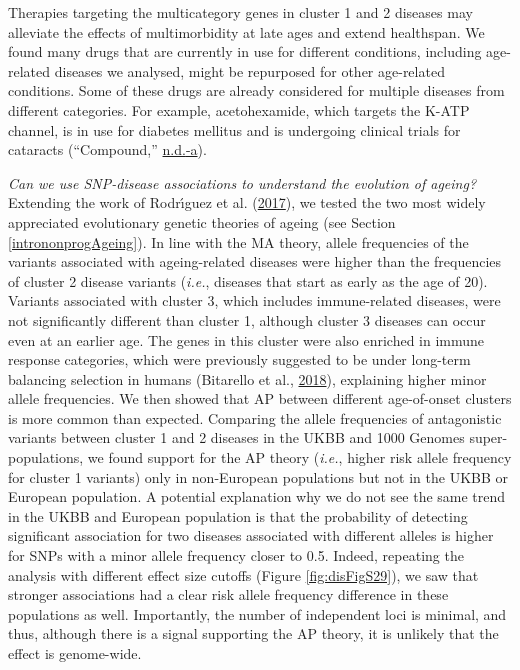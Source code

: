 \documentclass[12pt,twoside]{unicam}
\begin{document}
Therapies targeting the multicategory genes in cluster 1 and 2 diseases may alleviate the effects of multimorbidity at late ages and extend healthspan. We found many drugs that are currently in use for different conditions, including age-related diseases we analysed, might be repurposed for other age-related conditions. Some of these drugs are already considered for multiple diseases from different categories. For example, acetohexamide, which targets the K-ATP channel, is in use for diabetes mellitus and is undergoing clinical trials for cataracts (``Compound,'' \protect\hyperlink{ref-Acetohexamide2020}{n.d.}\protect\hyperlink{ref-Acetohexamide2020}{-a}).

\emph{Can we use SNP-disease associations to understand the evolution of ageing?} Extending the work of Rodrı́guez et al. (\protect\hyperlink{ref-Rodriguez2017}{2017}), we tested the two most widely appreciated evolutionary genetic theories of ageing (see Section \ref{intrononprogAgeing}). In line with the MA theory, allele frequencies of the variants associated with ageing-related diseases were higher than the frequencies of cluster 2 disease variants (\emph{i.e.}, diseases that start as early as the age of 20). Variants associated with cluster 3, which includes immune-related diseases, were not significantly different than cluster 1, although cluster 3 diseases can occur even at an earlier age. The genes in this cluster were also enriched in immune response categories, which were previously suggested to be under long-term balancing selection in humans (Bitarello et al., \protect\hyperlink{ref-Bitarello2018}{2018}), explaining higher minor allele frequencies. We then showed that AP between different age-of-onset clusters is more common than expected. Comparing the allele frequencies of antagonistic variants between cluster 1 and 2 diseases in the UKBB and 1000 Genomes super-populations, we found support for the AP theory (\emph{i.e.}, higher risk allele frequency for cluster 1 variants) only in non-European populations but not in the UKBB or European population. A potential explanation why we do not see the same trend in the UKBB and European population is that the probability of detecting significant association for two diseases associated with different alleles is higher for SNPs with a minor allele frequency closer to 0.5. Indeed, repeating the analysis with different effect size cutoffs (Figure \ref{fig:disFigS29}), we saw that stronger associations had a clear risk allele frequency difference in these populations as well. Importantly, the number of independent loci is minimal, and thus, although there is a signal supporting the AP theory, it is unlikely that the effect is genome-wide.
\end{document}

